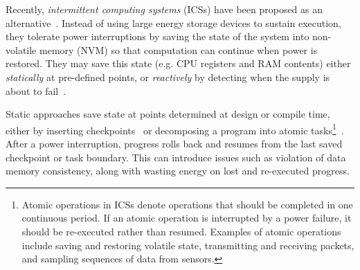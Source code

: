 Recently, \textit{intermittent computing systems} (ICSs) have been proposed as an alternative~\cite{doi:10.1098/rsta.2019.0158}. Instead of using large energy storage devices to sustain execution, they tolerate power interruptions by saving the state of the system into non-volatile memory (NVM) so that computation can continue when power is restored. They may save this state (e.g. CPU registers and RAM contents) either \textit{statically} at pre-defined points, or \textit{reactively} by detecting when the supply is about to fail~\cite{doi:10.1098/rsta.2019.0158}.

Static approaches save state at points determined at design or compile time, either by inserting checkpoints~\cite{Ransford:2011:MSS:1950365.1950386, 7944791} or decomposing a program into atomic tasks\footnote{Atomic operations in ICSs denote operations that should be completed in one continuous period. If an atomic operation is interrupted by a power failure, it should be re-executed rather than resumed. Examples of atomic operations include saving and restoring volatile state, transmitting and receiving packets, and sampling sequences of data from sensors.}~\cite{10.1145/3360285, Maeng:2017:AIE:3152284.3133920}. After a power interruption, progress rolls back and resumes from the last saved checkpoint or task boundary. This can introduce issues such as violation of data memory consistency, along with wasting energy on lost and re-executed progress.

